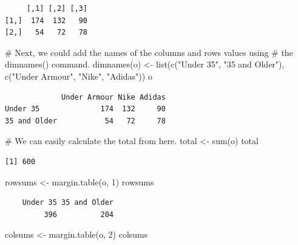 \documentclass[
  letterpaper,
  DIV=11,
  numbers=noendperiod]{scrreprt}
\newenvironment{Shaded}{\begin{snugshade}}{\end{snugshade}}
\newcommand{\CommentTok}[1]{\textcolor[rgb]{0.37,0.37,0.37}{#1}}
\newcommand{\DecValTok}[1]{\textcolor[rgb]{0.68,0.00,0.00}{#1}}
\newcommand{\FunctionTok}[1]{\textcolor[rgb]{0.28,0.35,0.67}{#1}}
\newcommand{\NormalTok}[1]{\textcolor[rgb]{0.00,0.23,0.31}{#1}}
\newcommand{\OtherTok}[1]{\textcolor[rgb]{0.00,0.23,0.31}{#1}}
\newcommand{\StringTok}[1]{\textcolor[rgb]{0.13,0.47,0.30}{#1}}
\begin{document}
\begin{verbatim}
     [,1] [,2] [,3]
[1,]  174  132   90
[2,]   54   72   78
\end{verbatim}

\begin{Shaded}
\begin{Highlighting}[]
\CommentTok{\# Next, we could add the names of the columns and rows values using}
\CommentTok{\# the dimnames() command.}
\FunctionTok{dimnames}\NormalTok{(o) }\OtherTok{\textless{}{-}} \FunctionTok{list}\NormalTok{(}\FunctionTok{c}\NormalTok{(}\StringTok{"Under 35"}\NormalTok{, }\StringTok{"35 and Older"}\NormalTok{), }\FunctionTok{c}\NormalTok{(}\StringTok{"Under Armour"}\NormalTok{, }\StringTok{"Nike"}\NormalTok{,}
    \StringTok{"Adidas"}\NormalTok{))}
\NormalTok{o}
\end{Highlighting}
\end{Shaded}

\begin{verbatim}
             Under Armour Nike Adidas
Under 35              174  132     90
35 and Older           54   72     78
\end{verbatim}

\begin{Shaded}
\begin{Highlighting}[]
\CommentTok{\# We can easily calculate the total from here.}
\NormalTok{total }\OtherTok{\textless{}{-}} \FunctionTok{sum}\NormalTok{(o)}
\NormalTok{total}
\end{Highlighting}
\end{Shaded}

\begin{verbatim}
[1] 600
\end{verbatim}

\begin{Shaded}
\begin{Highlighting}[]
\NormalTok{rowsums }\OtherTok{\textless{}{-}} \FunctionTok{margin.table}\NormalTok{(o, }\DecValTok{1}\NormalTok{)}
\NormalTok{rowsums}
\end{Highlighting}
\end{Shaded}

\begin{verbatim}
    Under 35 35 and Older 
         396          204 
\end{verbatim}

\begin{Shaded}
\begin{Highlighting}[]
\NormalTok{colsums }\OtherTok{\textless{}{-}} \FunctionTok{margin.table}\NormalTok{(o, }\DecValTok{2}\NormalTok{)}
\NormalTok{colsums}
\end{Highlighting}
\end{Shaded}
\end{document}

